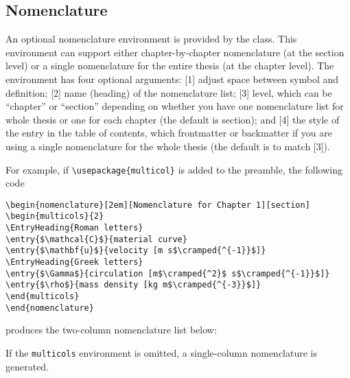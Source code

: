 \documentclass[11pt]{article}
\begin{document}
\subsection{Nomenclature}
An optional nomenclature environment is provided by the class.  This environment can support either chapter-by-chapter nomenclature (at the section level) or a single nomenclature for the entire thesis (at the chapter level). The environment has four optional arguments: [1] adjust space between symbol and definition; [2] name (heading) of the nomenclature list; [3] level, which can be ``chapter'' or ``section'' depending on whether you
have one nomenclature list for whole thesis or one for each chapter (the default is section); and [4] the style of the entry in the table of contents, which frontmatter or backmatter if you are using a single nomenclature for the whole thesis (the default is to match [3]).

For example, if \verb+\usepackage{multicol}+ is added to the preamble, the following code 
\begin{center}
\begin{minipage}{0.85\textwidth}
\begin{verbatim}
\begin{nomenclature}[2em][Nomenclature for Chapter 1][section]
\begin{multicols}{2}
\EntryHeading{Roman letters}
\entry{$\mathcal{C}$}{material curve}
\entry{$\mathbf{u}$}{velocity [m s$\cramped{^{-1}}$]}
\EntryHeading{Greek letters}
\entry{$\Gamma$}{circulation [m$\cramped{^2}$ s$\cramped{^{-1}}$]}
\entry{$\rho$}{mass density [kg m$\cramped{^{-3}}$]}
\end{multicols}
\end{nomenclature}
\end{verbatim}
\end{minipage}
\end{center}
produces the two-column nomenclature list below:

\begin{nomenclature}
\begin{multicols}{2}
\end{multicols}
\end{nomenclature}
If the \texttt{multicols} environment is omitted, a single-column nomenclature is generated.
\end{document}
